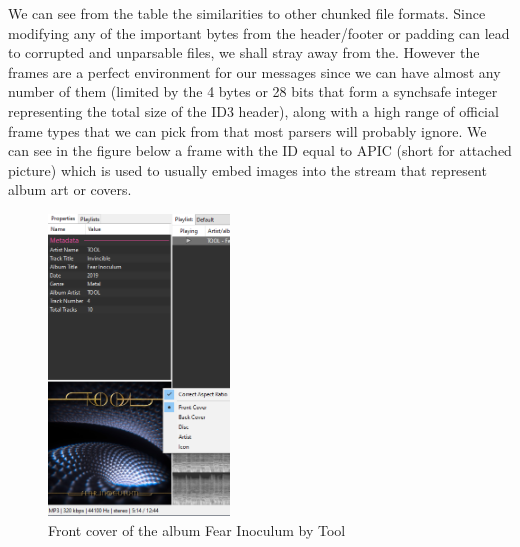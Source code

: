 \begin{multicols*}{2}
We can see from the table the similarities to other chunked file formats. Since modifying any of the important bytes from the header/footer or padding can lead to corrupted and unparsable files, we shall stray away from the. However the frames are a perfect environment for our messages since we can have almost any number of them (limited by the 4 bytes or 28 bits that form a synchsafe integer representing the total size of the ID3 header), along with a high range of official frame types that we can pick from that most parsers will probably ignore. We can see in the figure below a frame with the ID equal to APIC (short for attached picture) which is used to usually embed images into the stream that represent album art or covers.
\begin{figure}[H]
    \centering
    \includegraphics[height=8cm,keepaspectratio]{pics/audio_chapter/tool_cover_example.png}
    \caption{Front cover of the album Fear Inoculum by Tool}
\end{figure}


\end{multicols*}
